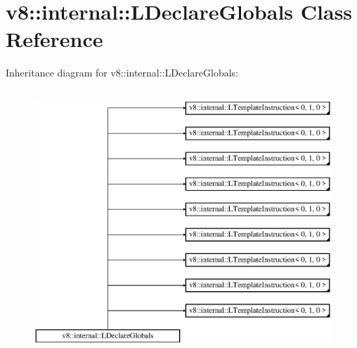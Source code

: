 \hypertarget{classv8_1_1internal_1_1_l_declare_globals}{}\section{v8\+:\+:internal\+:\+:L\+Declare\+Globals Class Reference}
\label{classv8_1_1internal_1_1_l_declare_globals}
Inheritance diagram for v8\+:\+:internal\+:\+:L\+Declare\+Globals\+:\begin{figure}[H]
\begin{center}
\leavevmode
\includegraphics[height=10.000000cm]{classv8_1_1internal_1_1_l_declare_globals}
\end{center}
\end{figure}
